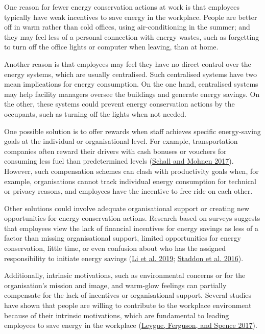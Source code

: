 \documentclass[
  11pt,
  captions=heading]{scrreport}
\begin{document}
One reason for fewer energy conservation actions at work is that
employees typically have weak incentives to save energy in the
workplace. People are better off in warm rather than cold offices, using
air-conditioning in the summer; and they may feel less of a personal
connection with energy wastes, such as forgetting to turn off the office
lights or computer when leaving, than at home.

Another reason is that employees may feel they have no direct control
over the energy systems, which are usually centralised. Such centralised
systems have two mean implications for energy consumption. On the one
hand, centralised systems may help facility managers oversee the
buildings and generate energy savings. On the other, these systems could
prevent energy conservation actions by the occupants, such as turning
off the lights when not needed.

One possible solution is to offer rewards when staff achieves specific
energy-saving goals at the individual or organisational level. For
example, transportation companies often reward their drivers with cash
bonuses or vouchers for consuming less fuel than predetermined levels
(\protect\hyperlink{ref-schall2017incentivizing}{Schall and Mohnen
2017}). However, such compensation schemes can clash with productivity
goals when, for example, organisations cannot track individual energy
consumption for technical or privacy reasons, and employees have the
incentive to free-ride on each other.

Other solutions could involve adequate organisational support or
creating new opportunities for energy conservation actions. Research
based on surveys suggests that employees view the lack of financial
incentives for energy savings as less of a factor than missing
organisational support, limited opportunities for energy conservation,
little time, or even confusion about who has the assigned responsibility
to initiate energy savings
(\protect\hyperlink{ref-li2019understanding}{Li et al. 2019};
\protect\hyperlink{ref-staddon2016intervening}{Staddon et al. 2016}).

Additionally, intrinsic motivations, such as environmental concerns or
for the organisation's mission and image, and warm-glow feelings can
partially compensate for the lack of incentives or organisational
support. Several studies have shown that people are willing to
contribute to the workplace environment because of their intrinsic
motivations, which are fundamental to leading employees to save energy
in the workplace (\protect\hyperlink{ref-leygue2017saving}{Leygue,
Ferguson, and Spence 2017}).
\end{document}
